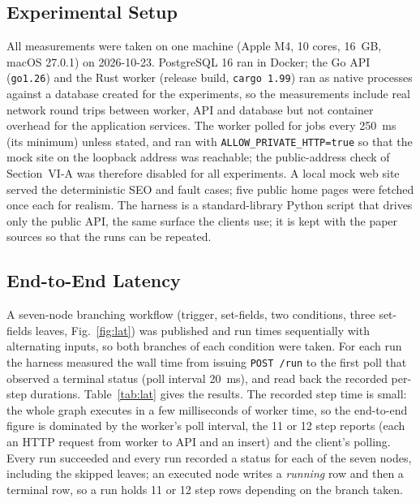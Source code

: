 \documentclass[conference]{IEEEtran}
\begin{document}
\subsection{Experimental Setup}
All measurements were taken on one machine (Apple M4, 10 cores, 16~GB, macOS 27.0.1) on 2026-10-23. PostgreSQL 16 ran in Docker; the Go API (\texttt{go1.26}) and the Rust worker (release build, \texttt{cargo 1.99}) ran as native processes against a database created for the experiments, so the measurements include real network round trips between worker, API and database but not container overhead for the application services. The worker polled for jobs every 250~ms (its minimum) unless stated, and ran with \texttt{ALLOW\_PRIVATE\_HTTP=true} so that the mock site on the loopback address was reachable; the public-address check of Section~VI-A was therefore disabled for all experiments. A local mock web site served the deterministic SEO and fault cases; five public home pages were fetched once each for realism. The harness is a standard-library Python script that drives only the public API, the same surface the clients use; it is kept with the paper sources so that the runs can be repeated.

\subsection{End-to-End Latency}
A seven-node branching workflow (trigger, set-fields, two conditions, three set-fields leaves, Fig.~\ref{fig:lat}) was published and run \LATn{} times sequentially with alternating inputs, so both branches of each condition were taken. For each run the harness measured the wall time from issuing \texttt{POST /run} to the first poll that observed a terminal status (poll interval 20~ms), and read back the recorded per-step durations. Table~\ref{tab:lat} gives the results. The recorded step time is small: the whole graph executes in a few milliseconds of worker time, so the end-to-end figure is dominated by the worker's poll interval, the 11 or 12 step reports (each an HTTP request from worker to API and an insert) and the client's polling. Every run succeeded and every run recorded a status for each of the seven nodes, including the skipped leaves; an executed node writes a \emph{running} row and then a terminal row, so a run holds 11 or 12 step rows depending on the branch taken.
\end{document}
